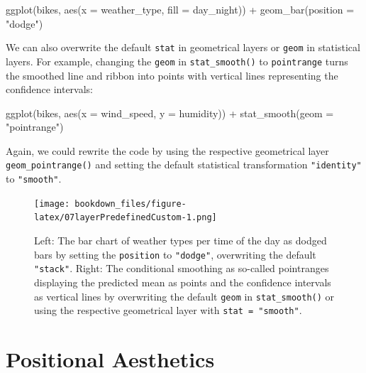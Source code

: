 \documentclass[
]{krantz}
\makeatletter
\newenvironment{Shaded}{\begin{snugshade}}{\end{snugshade}}
\newcommand{\AttributeTok}[1]{\textcolor[rgb]{0.61,0.61,0.61}{#1}}
\newcommand{\FunctionTok}[1]{\textcolor[rgb]{0,0,0}{#1}}
\newcommand{\NormalTok}[1]{#1}
\newcommand{\SpecialCharTok}[1]{\textcolor[rgb]{0,0,0}{#1}}
\newcommand{\StringTok}[1]{\textcolor[rgb]{0.5,0.5,0.5}{#1}}
\newenvironment{kframe}{%
\medskip{}
\setlength{\fboxsep}{.8em}
 \def\at@end@of@kframe{}%
 \ifinner\ifhmode%
  \def\at@end@of@kframe{\end{minipage}}%
  \begin{minipage}{\columnwidth}%
 \fi\fi%
 \def\FrameCommand##1{\hskip\@totalleftmargin \hskip-\fboxsep
 \colorbox{shadecolor}{##1}\hskip-\fboxsep
     \hskip-\linewidth \hskip-\@totalleftmargin \hskip\columnwidth}%
 \MakeFramed {\advance\hsize-\width
   \@totalleftmargin\z@ \linewidth\hsize
   \@setminipage}}%
 {\par\unskip\endMakeFramed%
 \at@end@of@kframe}
\renewenvironment{Shaded}{\begin{kframe}}{\end{kframe}}
\makeatother
\begin{document}
\begin{Shaded}
\begin{Highlighting}[]
\FunctionTok{ggplot}\NormalTok{(bikes, }\FunctionTok{aes}\NormalTok{(}\AttributeTok{x =}\NormalTok{ weather\_type, }\AttributeTok{fill =}\NormalTok{ day\_night)) }\SpecialCharTok{+}
  \FunctionTok{geom\_bar}\NormalTok{(}\AttributeTok{position =} \StringTok{"dodge"}\NormalTok{)}
\end{Highlighting}
\end{Shaded}

We can also overwrite the default \texttt{stat} in geometrical layers or \texttt{geom} in statistical layers. For example, changing the \texttt{geom} in \texttt{stat\_smooth()} to \texttt{pointrange} turns the smoothed line and ribbon into points with vertical lines representing the confidence intervals:

\begin{Shaded}
\begin{Highlighting}[]
\FunctionTok{ggplot}\NormalTok{(bikes, }\FunctionTok{aes}\NormalTok{(}\AttributeTok{x =}\NormalTok{ wind\_speed, }\AttributeTok{y =}\NormalTok{ humidity)) }\SpecialCharTok{+}
  \FunctionTok{stat\_smooth}\NormalTok{(}\AttributeTok{geom =} \StringTok{"pointrange"}\NormalTok{)}
\end{Highlighting}
\end{Shaded}

Again, we could rewrite the code by using the respective geometrical layer \texttt{geom\_pointrange()} and setting the default statistical transformation \texttt{"identity"} to \texttt{"smooth"}.

\begin{figure}
\centering
\texttt{[image: bookdown\_files/figure-latex/07layerPredefinedCustom-1.png]}
\caption{\label{fig:07layerPredefinedCustom}Left: The bar chart of weather types per time of the day as dodged bars by setting the \texttt{position} to \texttt{"dodge"}, overwriting the default \texttt{"stack"}. Right: The conditional smoothing as so-called pointranges displaying the predicted mean as points and the confidence intervals as vertical lines by overwriting the default \texttt{geom} in \texttt{stat\_smooth()} or using the respective geometrical layer with \texttt{stat\ =\ "smooth"}.}
\end{figure}

\hypertarget{positional-aesthetics}{%
\section{Positional Aesthetics}\label{positional-aesthetics}}
\end{document}
